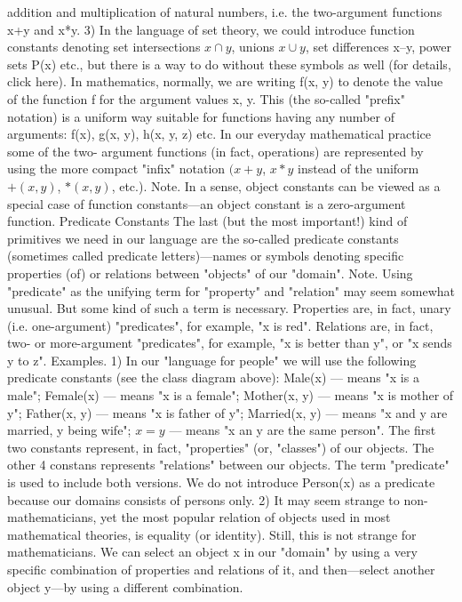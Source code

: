 addition and multiplication of natural numbers, i.e. the two-argument functions x+y and x*y.
3) In the language of set theory, we could introduce function constants denoting set intersections \(x\cap y\), unions \(x\cup y\), set
differences x–y, power sets P(x) etc., but there is a way to do without these symbols as well (for details, click here).
In mathematics, normally, we are writing f(x, y) to denote the value of the function f for the argument
values x, y. This (the so-called "prefix" notation) is a uniform way suitable for functions having any
number of arguments: f(x), g(x, y), h(x, y, z) etc. In our everyday mathematical practice some of the two-
argument functions (in fact, operations) are represented by using the more compact "infix" notation \((x+y\),
\(x*y\) instead of the uniform \(+(x, y)\), \(*(x, y)\), etc.).
Note. In a sense, object constants can be viewed as a special case of function constants---an object
constant is a zero-argument function.
Predicate Constants
The last (but the most important!) kind of primitives we need in our language are the so-called predicate
constants (sometimes called predicate letters)---names or symbols denoting specific properties (of) or
relations between "objects" of our "domain".
Note. Using "predicate" as the unifying term for "property" and "relation" may seem somewhat unusual.
But some kind of such a term is necessary. Properties are, in fact, unary (i.e. one-argument) "predicates",
for example, "x is red". Relations are, in fact, two- or more-argument "predicates", for example, "x is
better than y", or "x sends y to z".
Examples. 1) In our "language for people" we will use the following predicate constants (see the class diagram above):
Male(x) --- means "x is a male";
Female(x) --- means "x is a female";
Mother(x, y) --- means "x is mother of y";
Father(x, y) --- means "x is father of y";
Married(x, y) --- means "x and y are married, y being wife";
\(x=y\) --- means "x an y are the same person".
The first two constants represent, in fact, "properties" (or, "classes") of our objects. The other 4 constans represents "relations"
between our objects. The term "predicate" is used to include both versions. We do not introduce Person(x) as a predicate
because our domains consists of persons only.
2) It may seem strange to non-mathematicians, yet the most popular relation of objects used in most mathematical theories, is
equality (or identity). Still, this is not strange for mathematicians. We can select an object x in our "domain" by using a very
specific combination of properties and relations of it, and then---select another object y---by using a different combination.
